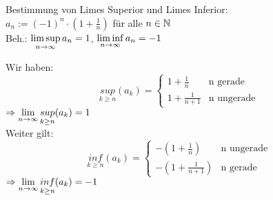 \documentclass[../ana1u.tex]{subfiles}
\begin{document}
\begin{bsp}
    Bestimmung von Limes Superior und Limes Inferior:\\
    \(a_n := (-1)^n \cdot (1 + \frac{1}{n})\) für alle \(n \in \mathbb{N}\)\\
    Beh.: \(\limsup\limits_{n\rightarrow\infty} a_n = 1\), \(\liminf\limits_{n\rightarrow\infty} a_n = -1\)\\
    \begin{bew}
        Wir haben:
        \[\underset{k \geq n}{sup} (a_k) =\begin{cases}
        1 + \frac{1}{n} & \text{n gerade}\\
        1 + \frac{1}{n + 1} & \text{n ungerade}
        \end{cases} \]
        \(\Rightarrow \lim\limits_{n\rightarrow\infty} \underset{k \geq n}{sup} (a_k) = 1\)\\
        Weiter gilt:
        \[\underset{k \geq n}{inf} (a_k) =\begin{cases}
        -(1 + \frac{1}{n} )& \text{n ungerade}\\
        -(1 + \frac{1}{n + 1}) & \text{n gerade}
        \end{cases} \]
        \(\Rightarrow \lim\limits_{n\rightarrow\infty} \underset{k \geq n}{inf} (a_k) = -1\)\\
    \end{bew}
\end{bsp}
\end{document}
